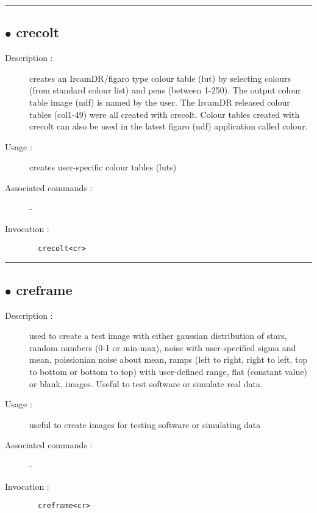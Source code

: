 \hrule \subsection*{$\bullet$ crecolt}
\begin{description}
\item[Description :] creates an IrcamDR/figaro type colour table (lut) by selecting
colours (from standard colour list) and pens (between 1-250).  The output
colour table image (ndf) is named by the user.  The IrcamDR released
colour tables (col1-49) were all created with crecolt.  Colour tables
created with crecolt can also be used in the latest figaro (ndf)
application called colour.
\item[Usage :] creates user-specific colour tables (luts)
\item[Associated commands :] -
\item[Invocation :]

\verb+  crecolt<cr> +\end{description}

\hrule \subsection*{$\bullet$ creframe}
\begin{description}
\item[Description :] used to create a test image with either gaussian distribution
of stars, random numbers (0-1 or min-max), noise with user-specified
sigma and mean, poissionian noise about mean, ramps (left to right, right
to left, top to bottom or bottom to top) with user-defined range, flat
(constant value) or blank, images.  Useful to test software or simulate
real data.
\item[Usage :] useful to create images for testing software or simulating data
\item[Associated commands :] -
\item[Invocation :]

\verb+  creframe<cr> +\end{description}

